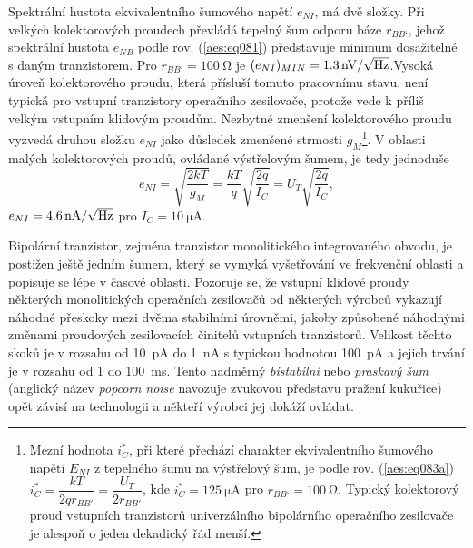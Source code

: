         Spektrální hustota ekvivalentního šumového napětí \(e_{NI}\), má dvě složky. Při velkých
        kolektorových proudech převládá tepelný šum odporu báze \(r_{BB‘}\), jehož spektrální
        hustota \(e_{NB}\) podle rov. (\ref{aes:eq081}) představuje minimum dosažitelné s daným
        tranzistorem. Pro \(r_{BB‘} = \SI{100}{\ohm}\) je \((e_{NI})_{MIN} = \SI[parse-numbers =
        false]{1.3}{\nV\per\sqrt{\Hz}}\).Vysoká úroveň kolektorového proudu, která přísluší tomuto
        pracovnímu stavu, není typická pro vstupní tranzistory operačního zesilovače, protože vede k
        příliš velkým vstupním klidovým proudům. Nezbytné zmenšení kolektorového proudu vyzvedá
        druhou složku \(e_{NI}\) jako důsledek zmenšené strmosti \(g_{M}\)\footnote{Mezní hodnota
        \(i^*_C\), při které přechází charakter ekvivalentního šumového napětí \(E_{NI}\) z
        tepelného šumu na výstřelový šum, je podle rov. (\ref {aes:eq083a}) \(i^*_C =
        \dfrac{kT}{2qr_{BB'}} = \dfrac{U_T}{2r_{BB'}}\), kde \(i^*_C = \SI{125}{\uA}\) pro \(r_{BB‘}
        = \SI{100}{\ohm}\). Typický kolektorový proud vstupních tranzistorů univerzálního
        bipolárního operačního zesilovače je alespoň o jeden dekadický řád menší.}. V oblasti malých
        kolektorových proudů, ovládané výstřelovým šumem, je tedy jednoduše
        \begin{equation}\label{aes:eq084}
          e_{NI} = \sqrt{\dfrac{2kT}{g_M}} = \dfrac{kT}{q}\sqrt{\dfrac{2q}{I_C}} 
                = U_T\sqrt{\dfrac{2q}{I_C}},
        \end{equation} 
        \(e_{NI} = \SI[parse-numbers = false]{4.6}{\nA\per\sqrt{\Hz}}\) pro \(I_C = \SI{10}{\uA}\).

        Bipolární tranzistor, zejména tranzistor monolitického integrovaného obvodu, je postižen
        ještě jedním šumem, který se vymyká vyšetřování ve frekvenční oblasti a popisuje se lépe v
        časové oblasti. Pozoruje se, že vstupní klidové proudy některých monolitických operačních
        zesilovačů od některých výrobců vykazují náhodné přeskoky mezi dvěma stabilními úrovněmi,
        jakoby způsobené náhodnými změnami proudových zesilovacích činitelů vstupních tranzistorů.
        Velikost těchto skoků je v rozsahu od \SI{10}{\pA} do \SI{1}{\nA} s typickou hodnotou
        \SI{100}{\pA} a jejich trvání je v rozsahu od 1 do \SI{100}{\ms}. Tento nadměrný
        \emph{bistabilní} nebo \emph{praskavý šum} (anglický název \emph{popcorn noise} navozuje
        zvukovou představu pražení kukuřice) opět závisí na technologii a někteří výrobci jej dokáží
        ovládat.

